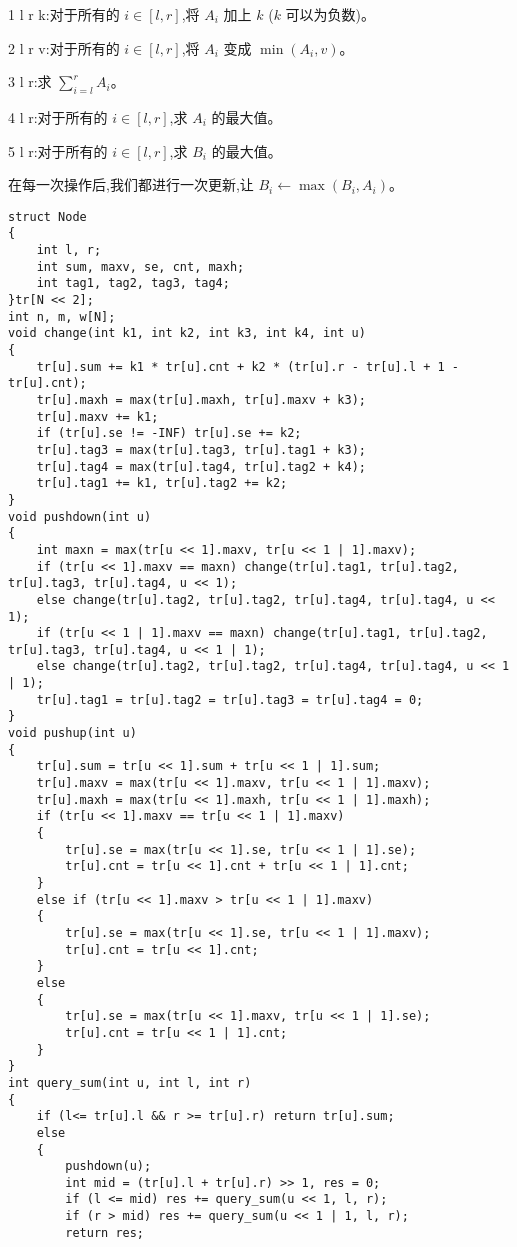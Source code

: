 \documentclass[a4paper, fontset=none]{ctexart}
\begin{document}
1 l r k:对于所有的 $i\in[l, r]$,将 $A_i$ 加上 $k$ ($k$ 可以为负数)。

2 l r v:对于所有的 $i\in[l, r]$,将 $A_i$ 变成 $\min(A_i, v)$。

3 l r:求 $\sum_{i=l}^{r}A_i$。

4 l r:对于所有的 $i\in[l, r]$,求 $A_i$ 的最大值。

5 l r:对于所有的 $i\in[l, r]$,求 $B_i$ 的最大值。

在每一次操作后,我们都进行一次更新,让 $B_i\gets\max(B_i, A_i)$。

\begin{verbatim}
struct Node
{
    int l, r;
    int sum, maxv, se, cnt, maxh;
    int tag1, tag2, tag3, tag4;
}tr[N << 2];
int n, m, w[N];
void change(int k1, int k2, int k3, int k4, int u)
{
    tr[u].sum += k1 * tr[u].cnt + k2 * (tr[u].r - tr[u].l + 1 - tr[u].cnt);
    tr[u].maxh = max(tr[u].maxh, tr[u].maxv + k3);
    tr[u].maxv += k1;
    if (tr[u].se != -INF) tr[u].se += k2;
    tr[u].tag3 = max(tr[u].tag3, tr[u].tag1 + k3);
    tr[u].tag4 = max(tr[u].tag4, tr[u].tag2 + k4);
    tr[u].tag1 += k1, tr[u].tag2 += k2;
}
void pushdown(int u)
{
    int maxn = max(tr[u << 1].maxv, tr[u << 1 | 1].maxv);
    if (tr[u << 1].maxv == maxn) change(tr[u].tag1, tr[u].tag2, tr[u].tag3, tr[u].tag4, u << 1);
    else change(tr[u].tag2, tr[u].tag2, tr[u].tag4, tr[u].tag4, u << 1);
    if (tr[u << 1 | 1].maxv == maxn) change(tr[u].tag1, tr[u].tag2, tr[u].tag3, tr[u].tag4, u << 1 | 1);
    else change(tr[u].tag2, tr[u].tag2, tr[u].tag4, tr[u].tag4, u << 1 | 1);
    tr[u].tag1 = tr[u].tag2 = tr[u].tag3 = tr[u].tag4 = 0;
}
void pushup(int u)
{
    tr[u].sum = tr[u << 1].sum + tr[u << 1 | 1].sum;
    tr[u].maxv = max(tr[u << 1].maxv, tr[u << 1 | 1].maxv);
    tr[u].maxh = max(tr[u << 1].maxh, tr[u << 1 | 1].maxh);
    if (tr[u << 1].maxv == tr[u << 1 | 1].maxv)
    {
        tr[u].se = max(tr[u << 1].se, tr[u << 1 | 1].se);
        tr[u].cnt = tr[u << 1].cnt + tr[u << 1 | 1].cnt;
    }
    else if (tr[u << 1].maxv > tr[u << 1 | 1].maxv)
    {
        tr[u].se = max(tr[u << 1].se, tr[u << 1 | 1].maxv);
        tr[u].cnt = tr[u << 1].cnt;
    }
    else
    {
        tr[u].se = max(tr[u << 1].maxv, tr[u << 1 | 1].se);
        tr[u].cnt = tr[u << 1 | 1].cnt;
    }
}
int query_sum(int u, int l, int r)
{
    if (l<= tr[u].l && r >= tr[u].r) return tr[u].sum;
    else
    {
        pushdown(u);
        int mid = (tr[u].l + tr[u].r) >> 1, res = 0;
        if (l <= mid) res += query_sum(u << 1, l, r);
        if (r > mid) res += query_sum(u << 1 | 1, l, r);
        return res;

\end{verbatim}
\end{document}
